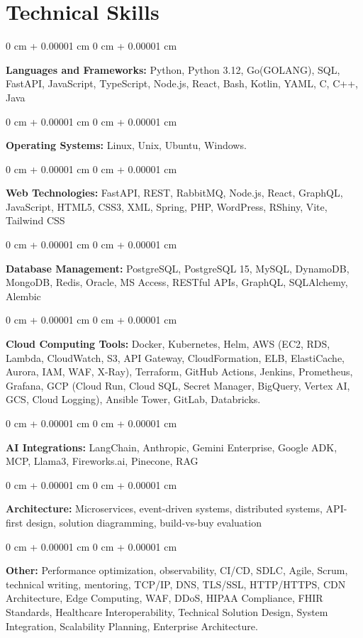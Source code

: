 \documentclass[10pt, letterpaper]{article}
\newenvironment{onecolentry}{
    \begin{adjustwidth}{
        0 cm + 0.00001 cm
    }{
        0 cm + 0.00001 cm
    }
}{
    \end{adjustwidth}
} %
\begin{document}
    \section{Technical Skills}
    \vspace{2 pt }
    \begin{onecolentry}
    \textbf{Languages and Frameworks:} Python, Python 3.12, Go(GOLANG), SQL, FastAPI, JavaScript, TypeScript, Node.js, React, Bash, Kotlin, YAML, C, C++, Java
    \end{onecolentry}
    \begin{onecolentry}
        \textbf{Operating Systems:} Linux, Unix, Ubuntu, Windows.
    \end{onecolentry}
    \begin{onecolentry}
         \textbf{Web Technologies:} FastAPI, REST, RabbitMQ, Node.js, React, GraphQL, JavaScript, HTML5, CSS3, XML, Spring, PHP, WordPress, RShiny, Vite, Tailwind CSS
    \end{onecolentry}
    \begin{onecolentry}
        \textbf{Database Management:} PostgreSQL, PostgreSQL 15, MySQL, DynamoDB, MongoDB, Redis, Oracle, MS Access, RESTful APIs, GraphQL, SQLAlchemy, Alembic
    \end{onecolentry}
    \begin{onecolentry}
        \textbf{Cloud Computing Tools:}
Docker, Kubernetes, Helm, AWS (EC2, RDS, Lambda, CloudWatch, S3, API Gateway, CloudFormation, ELB, ElastiCache, Aurora, IAM, WAF, X-Ray), Terraform, GitHub Actions, Jenkins, Prometheus, Grafana, GCP (Cloud Run, Cloud SQL, Secret Manager, BigQuery, Vertex AI, GCS, Cloud Logging), Ansible Tower, GitLab, Databricks.
    \end{onecolentry}
    \begin{onecolentry}
         \textbf{AI Integrations:} LangChain, Anthropic, Gemini Enterprise, Google ADK, MCP, Llama3, Fireworks.ai, Pinecone, RAG
    \end{onecolentry}
    \begin{onecolentry}
        \textbf{Architecture:} Microservices, event-driven systems, distributed systems, API-first design, solution diagramming, build-vs-buy evaluation
    \end{onecolentry}
        \begin{onecolentry}
     \textbf{Other:} Performance optimization, observability, CI/CD, SDLC, Agile, Scrum, technical writing, mentoring, TCP/IP, DNS, TLS/SSL, HTTP/HTTPS, CDN Architecture, Edge Computing, WAF, DDoS, HIPAA Compliance, FHIR Standards, Healthcare Interoperability, Technical Solution Design, System Integration, Scalability Planning, Enterprise Architecture.
    \end{onecolentry}
\end{document}
